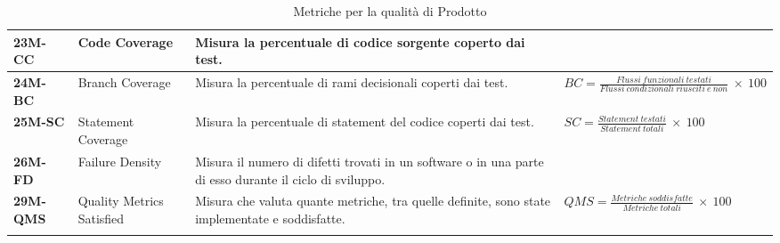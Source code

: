 \begin{longtable}{|>{\centering\arraybackslash}p{}|>{\centering\arraybackslash}p{}|>{\centering\arraybackslash}p{}|>{\centering\arraybackslash}p{}|}
    \hline
    \textbf{23M-CC}      & Code Coverage    &  Misura la percentuale di codice sorgente coperto dai test. & \\
    \hline
    \textbf{24M-BC}      & Branch Coverage    &  Misura la percentuale di rami decisionali coperti dai test. & $BC =\frac{Flussi\:funzionali\: testati}{Flussi\:condizionali\: riusciti\: e\: non}\: \times \: 100$ \\
    \hline
    \textbf{25M-SC}      & Statement Coverage    &  Misura la percentuale di statement del codice coperti dai test. & $SC = \frac{Statement\: testati}{Statement\: totali}\: \times \: 100$ \\
    \hline
    \textbf{26M-FD}      & Failure Density    &  Misura il numero di difetti trovati in un software o in una parte di esso durante il ciclo di sviluppo. & \\
    \hline
    \textbf{29M-QMS}      & Quality Metrics Satisfied    &  Misura che valuta quante metriche, tra quelle definite, sono state implementate e soddisfatte. & $QMS = \frac{Metriche\: soddisfatte}{Metriche\: totali}\: \times \: 100$ \\
    \hline
    \caption{Metriche per la qualità di Prodotto}
    \label{table:4}
\end{longtable}